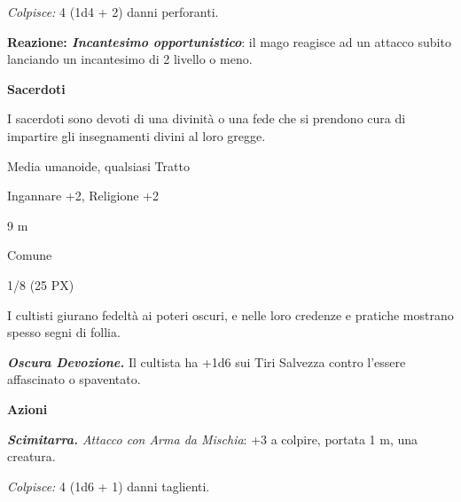 \begin{multicols}{2}
{\emph{Colpisce:} 4 (1d4 + 2) danni perforanti.

\textbf{Reazione: \emph{Incantesimo opportunistico}}: il mago reagisce ad un attacco subito lanciando un incantesimo di 2 livello o meno.

\medskip\textbf{Sacerdoti}

I sacerdoti sono devoti di una divinità o una fede che si prendono cura di impartire gli insegnamenti divini al loro gregge.

\begin{description}[noitemsep, topsep=0pt, parsep=0pt, partopsep=0pt, itemsep=1pt, leftmargin=2.35cm,  labelwidth=2.2cm, itemindent=0cm, listparindent=0pt] %
\setlength{\baselineskip}{10pt}
\item[\textbf{Taglia/Tipo}] Media umanoide, qualsiasi Tratto
\item[\textbf{Caratt.}] 
\item[\textbf{Punti Ferita}] 
\item[\textbf{Comp.}] Ingannare +2, Religione +2
\item[\textbf{Tiri Salvez.}] 
\item[\textbf{Movimento}] 9 m
\item[\textbf{Linguaggi}] Comune
\item[\textbf{Sfida}] 1/8 (25 PX)
\end{description}
\smallskip

I cultisti giurano fedeltà ai poteri oscuri, e nelle loro credenze e pratiche mostrano spesso segni di follia.

\emph{\textbf{Oscura Devozione.}} Il cultista ha +1d6 sui Tiri Salvezza contro l'essere affascinato o spaventato.

\textbf{Azioni}

\emph{\textbf{Scimitarra.} Attacco con Arma da Mischia}: +3 a colpire, portata 1 m, una creatura.

\emph{Colpisce:} 4 (1d6 + 1) danni taglienti.

}
\end{multicols}
